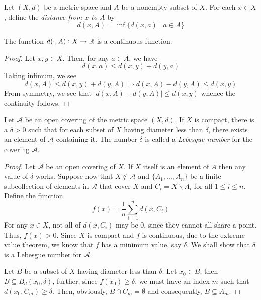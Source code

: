 \begin{definition}
    Let $(X,d)$ be a metric space and $A$ be a nonempty subset of $X$. For each $x\in X$, define the \textit{distance from $x$ to $A$} by 
    \begin{equation*}
        d(x, A) = \inf\{d(x,a)\mid a\in A\}
    \end{equation*}
\end{definition}

\begin{proposition}
    The function $d(\cdot,A): X\to\mathbb{R}$ is a continuous function.
\end{proposition}
\begin{proof}
    Let $x,y\in X$. Then, for any $a\in A$, we have
    \begin{equation*}
        d(x,a)\le d(x,y) + d(y,a)
    \end{equation*}
    Taking infimum, we see 
    \begin{equation*}
        d(x,A)\le d(x,y) + d(y,A)\Longrightarrow d(x,A) - d(y,A)\le d(x,y)
    \end{equation*}
    From symmetry, we see that $|d(x,A) - d(y,A)|\le d(x,y)$ whence the continuity follows.
\end{proof}

\begin{lemma}
    Let $\mathscr{A}$ be an open covering of the metric space $(X,d)$. If $X$ is compact, there is a $\delta > 0$ such that for each subset of $X$ having diameter less than $\delta$, there exists an element of $\mathscr{A}$ containing it. The number $\delta$ is called a \textit{Lebesgue number} for the covering $\mathscr{A}$.
\end{lemma}
\begin{proof}
    Let $\mathscr{A}$ be an open covering of $X$. If $X$ itself is an element of $A$ then any value of $\delta$ works. Suppose now that $X\notin\mathscr{A}$ and $\{A_1,\ldots,A_n\}$ be a finite subcollection of elements in $\mathscr{A}$ that cover $X$ and $C_i = X\backslash A_i$ for all $1\le i\le n$. Define the function 
    \begin{equation*}
        f(x) = \frac{1}{n}\sum_{i=1}^nd(x, C_i)
    \end{equation*}
    For any $x\in X$, not all of $d(x,C_i)$ may be $0$, since they cannot all share a point. Thus, $f(x) > 0$. Since $X$ is compact and $f$ is continuous, due to the extreme value theorem, we know that $f$ has a minimum value, say $\delta$. We shall show that $\delta$ is a Lebesgue number for $\mathscr{A}$.

    Let $B$ be a subset of $X$ having diameter less than $\delta$. Let $x_0\in B$; then $B\subseteq B_d(x_0, \delta)$, further, since $f(x_0)\ge\delta$, we must have an index $m$ such that $d(x_0, C_m)\ge\delta$. Then, obviously, $B\cap C_m =\emptyset$ and consequently, $B\subseteq A_m$.
\end{proof}

